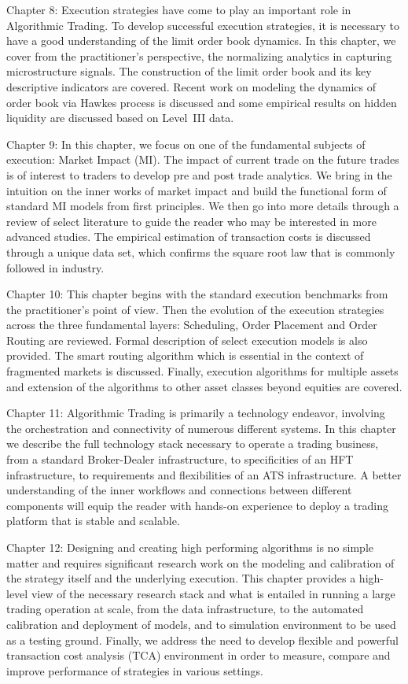 Chapter 8: Execution strategies have come to play an important role in Algorithmic Trading. To develop successful execution strategies, it is necessary to have a good understanding of the limit order book dynamics. In this chapter, we cover from the practitioner's perspective, the normalizing analytics in capturing microstructure signals. The construction of the limit order book and its key descriptive indicators are covered. Recent work on modeling the dynamics of order book via Hawkes process is discussed and some empirical results on hidden liquidity are discussed based on Level~III data.  


Chapter 9:  In this chapter, we focus on one of the fundamental subjects of execution: Market Impact (MI). The impact of current trade on the future trades is of interest to traders to develop pre and post trade analytics. We bring in the intuition on the inner works of market impact and build the functional form of standard MI models from first principles. We then go into more details through a review of select literature to guide the reader who may be interested in more advanced studies. The empirical estimation of transaction costs is discussed through a unique data set, which confirms the square root law that is commonly followed in industry. 


Chapter 10: This chapter begins with the standard execution benchmarks from the practitioner's point of view. Then the evolution of the execution strategies across the three fundamental layers: Scheduling, Order Placement and Order Routing are reviewed. Formal description of select execution models is also provided. The smart routing algorithm which is essential in the context of fragmented markets is discussed. Finally, execution algorithms for multiple assets and extension of the algorithms to other asset classes beyond equities are covered. 

Chapter 11: Algorithmic Trading is primarily a technology endeavor, involving the orchestration and connectivity of numerous different systems. In this chapter we describe the full technology stack necessary to operate a trading business, from a standard Broker-Dealer infrastructure, to specificities of an HFT infrastructure, to requirements and flexibilities of an ATS infrastructure. A better understanding of the inner workflows and connections between different components will equip the reader with hands-on experience to deploy a trading platform that is stable and scalable.


Chapter 12: Designing and creating high performing algorithms is no simple matter and requires significant research work on the modeling and calibration of the strategy itself and the underlying execution. This chapter provides a high-level view of the necessary research stack and what is entailed in running a large trading operation at scale, from the data infrastructure, to the automated calibration and deployment of models, and to simulation environment to be used as a testing ground. Finally, we address the need to develop flexible and powerful transaction cost analysis (TCA) environment in order to measure, compare and improve performance of strategies in various settings.